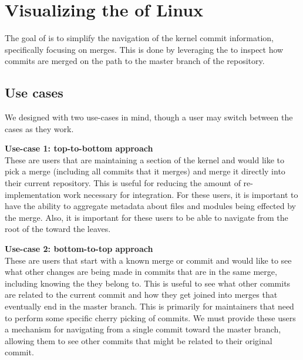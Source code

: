 \documentclass[AMA]{Wiley}
\begin{document}
\title{\TheTitle}

\author{Evan Wilde*}
\author{Daniel M. German}


\address{, , }



\abstract[Summary]{}

\keywords{\TheKeywords}

\maketitle





\section{Visualizing the \mt of Linux}

The goal of \tool is to simplify the navigation of the kernel commit
information, specifically focusing on merges. This is done by leveraging
the \mt to inspect how commits are merged on the path to the
master branch of the repository.

\subsection{Use cases}

We designed \tool with two use-cases in mind, though a user may switch
between the cases as they work.

\noindent \textbf{Use-case 1: top-to-bottom approach}
\label{sec:usecase1}\\ These are users that are maintaining a section of
the kernel and would like to pick a merge (including all commits that it
merges) and merge it directly into their current repository. This is
useful for reducing the amount of re-implementation work necessary for
integration. For these users, it is important to have the ability to
aggregate metadata about files and modules being effected by the merge.
Also, it is important for these users to be able to navigate from the
root of the \mt toward the leaves.

\noindent \textbf{Use-case 2: bottom-to-top approach}
\label{sec:usecase2}\\ These are users that start with a known merge or
commit and would like to see what other changes are being made in
commits that are in the same merge, including knowing the \mt
they belong to. This is useful to see what other commits are related to
the current commit and how they get joined into merges that eventually
end in the master branch. This is primarily for maintainers that need to
perform some specific cherry picking of commits. We must provide these
users a mechanism for navigating from a single commit toward the master
branch, allowing them to see other commits that might be related to
their original commit.
\end{document}
